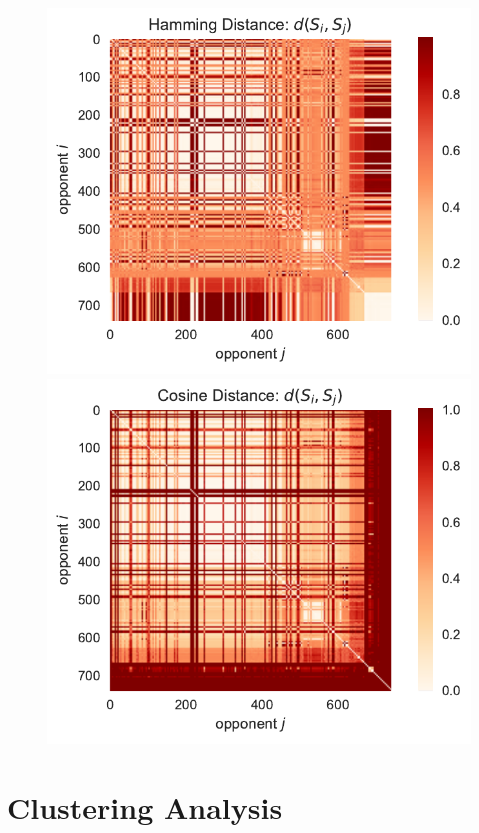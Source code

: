 \begin{figure}[ht]
        \centering
        \begin{minipage}{0.48\textwidth}
            \centering
            \includegraphics[width=1.0\textwidth, center]{./img/dist_matrix/dist_ham.pdf}
            \caption{}\label{fig:dist_ham}
        \end{minipage}\hfill
        \begin{minipage}{0.48\textwidth}
            \includegraphics[width=1.0\textwidth]{./img/dist_matrix/dist_cos.pdf} 
            \caption{}\label{fig:dist_cos}
        \end{minipage}
    \end{figure}

\section{Clustering Analysis}